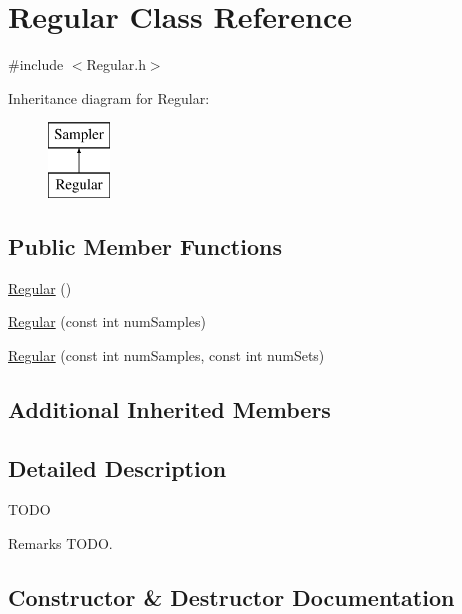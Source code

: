 \hypertarget{class_regular}{}\section{Regular Class Reference}
\label{class_regular}


{\ttfamily \#include $<$Regular.\+h$>$}

Inheritance diagram for Regular\+:\begin{figure}[H]
\begin{center}
\leavevmode
\includegraphics[height=2.000000cm]{class_regular}
\end{center}
\end{figure}
\subsection*{Public Member Functions}
\begin{DoxyCompactItemize}
\item 
\hyperlink{class_regular_ab37276a838198e8c3c14c6c0bd802a7b}{Regular} ()
\item 
\hyperlink{class_regular_a92a20b6c0adcd956b36c315a90eaff88}{Regular} (const int num\+Samples)
\item 
\hyperlink{class_regular_a2df0fa6fdfe2f6cf707677997486b395}{Regular} (const int num\+Samples, const int num\+Sets)
\end{DoxyCompactItemize}
\subsection*{Additional Inherited Members}


\subsection{Detailed Description}
T\+O\+DO \begin{DoxyRemark}{Remarks}
T\+O\+DO. 
\end{DoxyRemark}


\subsection{Constructor \& Destructor Documentation}
\hypertarget{class_regular_ab37276a838198e8c3c14c6c0bd802a7b}{}\label{class_regular_ab37276a838198e8c3c14c6c0bd802a7b} 
